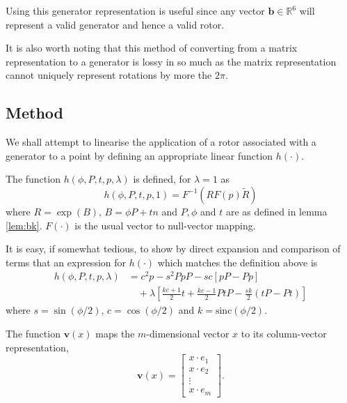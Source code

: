 Using this generator representation is useful since any vector
$\mathbf{b} \in {\mathbb R}^6$ will represent a valid generator and
hence a valid rotor.


It is also worth noting that this method of converting from a matrix representation
to a generator is lossy in so much as the matrix representation cannot uniquely
represent rotations by more the $2\pi$.

\subsection{Method}

We shall attempt to linearise the application of a rotor associated
with a generator to a point by defining an appropriate linear function
$h(\cdot)$.

\begin{definition}
The function $h(\phi, P, t, p, \lambda)$ is defined, for $\lambda = 1$ as
\[
h(\phi, P, t, p, 1) = F^{-1} \left( R F(p) \tilde{R} \right)
\]
where $R = \exp(B)$, $B = \phi P+tn$ and $P, \phi$ and $t$ are
as defined in lemma \ref{lem:bk}. $F(\cdot)$ is the usual vector 
to null-vector mapping.
\end{definition}

It is easy, if somewhat tedious, to show by direct expansion and comparison of terms that
an expression for $h(\cdot)$ which matches the definition above is
\begin{align}
h(\phi, P, t, p, \lambda) &=c^2p - s^2PpP - sc\left[pP - Pp\right] \nonumber \\
&\quad+ \lambda\left[ 
 \frac{kc+1}{2} t + \frac{kc-1}{2} PtP
- \frac{sk}{2} (tP - Pt)
\right] \label{eqn:defnh}
\end{align}
where $s = \sin(\phi/2)$, $c = \cos(\phi/2)$ and $k = \textrm{sinc}(\phi/2)$.

\begin{definition}
The function $\mathbf{v}(x)$ maps the $m$-dimensional vector $x$ to its column-vector
representation,
\[
\mathbf{v}(x) = \left[
\begin{array}{c}
x \cdot e_1 \\ x \cdot e_2 \\ \vdots \\ x \cdot e_m
\end{array} 
\right].
\]
\end{definition}

